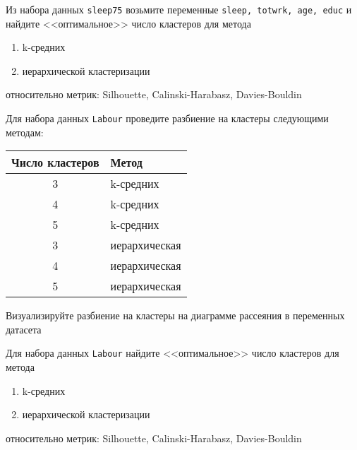 \begin{exercise}
Из набора данных \texttt{sleep75} возьмите переменные 
\texttt{sleep, totwrk, age, educ} и найдите <<оптимальное>> число кластеров
для метода
\begin{enumerate}
	\item k-средних
	\item иерархической кластеризации
\end{enumerate}
относительно метрик: Silhouette, Calinski-Harabasz, Davies-Bouldin
\end{exercise}

\begin{exercise}
Для набора данных \texttt{Labour} проведите разбиение на кластеры следующими
методам:
\begin{center}
	\begin{tabular}{c|l}
		Число кластеров & Метод \\ \hline
		3 & k-средних \\
		4 & k-средних \\
		5 & k-средних \\
		3 & иерархическая \\
		4 & иерархическая \\
		5 & иерархическая \\ \hline
	\end{tabular}
\end{center}
Визуализируйте разбиение на кластеры на диаграмме рассеяния в переменных датасета
\end{exercise}
	
\begin{exercise}
Для набора данных \texttt{Labour} найдите <<оптимальное>> число кластеров
для метода
\begin{enumerate}
	\item k-средних
	\item иерархической кластеризации
\end{enumerate}
относительно метрик: Silhouette, Calinski-Harabasz, Davies-Bouldin
\end{exercise}